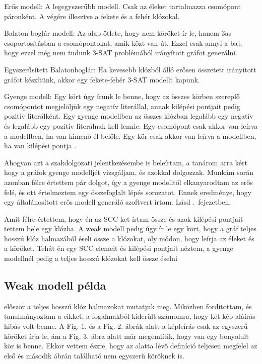 \documentclass[
]{thesis-ekf}
\theoremstyle{definition}
\theoremstyle{remark}
\begin{document}
	Erős modell: A legegyszerűbb modell. Csak az éleket tartalmazza csomópont páronként. A végére illesztve a fekete és a fehér klózokal.
		
	Balaton boglár modell: Az alap ötlete, hogy nem köröket ír le, hanem 3as csoportosításban a csomópontokat, amik közt van út. Ezzel csak annyi a baj, hogy ezzel még nem tudunk 3-\textsc{SAT} problémából irányított gráfot generálni.
	
	Egyszerűsített Balatonboglár: Ha kevesebb klózból álló erősen összetett irányított gráfot készítünk, akkor egy fekete-fehér 3-\textsc{SAT} modellt kapunk.

	Gyenge modell: Egy kört úgy írunk le benne, hogy az összes körben szereplő csomópontot megjelöljük egy negatív literállal, annak kilépési pontjait pedig pozitív literálként. Egy gyenge modellben az összes klózban legalább egy negatív és legalább egy pozitív literálnak kell lennie. Egy csomópont csak akkor van leírva a modellben, ha van kimenő él belőle. Egy kör csak akkor van leírva a modellben, ha van kilépési pontja \cite{sat-solving-50}.
	
	Ahogyan azt a szakdolgozati jelentkezésembe is beleírtam, a tanárom arra kért hogy a gráfok gyenge modelljét vizsgáljam, és azokkal dolgozzak. Munkám során azonban félre értettem pár dolgot, így a gyenge modelltől elkanyarodtam az erős felé, és ott értelmeztem egy összefoglalt lépés sorozatot. Ennek eredménye, hogy egy általánosított erős modell generáló szoftvert írtam. Lásd \az{\ref{kif-esm}}.~fejezetben.
	
	Amit félre értettem, hogy én az \textsc{SCC}-ket írtam össze és azok kilépési pontjait tettem bele egy klózba. A weak modell pedig úgy ír le egy kört, hogy a gráf teljes hosszú klóz halmazából éseli össze a klózokat, oly módon, hogy leírja az éleket és a köröket. Tehát én egy \textsc{SCC} elemeit és kilépési pontjait néztem, a gyenge modellnél pedig a teljes hosszú klózokat kell össze éselni 
	
		\subsection{Weak modell példa}
	\cite[Kusper Gábor és társai cikkjéből]{am} először a teljes hosszú klóz halmazokat mutatjuk meg. Miközben fordítottam, és tanulmányoztam a cikket, a fogalmakból kiderült számomra, hogy két kép aláírás hibás volt benne. A Fig. 1. és a Fig. 2. ábrák alatt a képleírás csak az egyszerű köröket írja le, ám a Fig. 3. ábra alatt már megemlítik, hogy van egy bonyolult kör is benne. Ekkor vettem észre, hogy az alatta lévő definíció teljesen megfelel az első és második ábrán található nem egyszerű köröknek is.
	 
\end{document}

